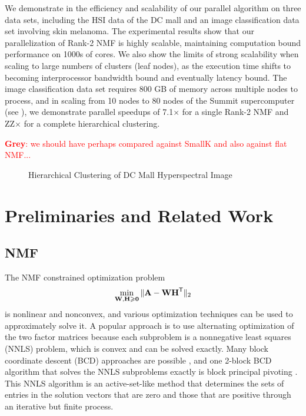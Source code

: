 \documentclass[conference,compsoc]{IEEEtran}
\newcommand{\GB}[1]{\textcolor{red}{\textbf{Grey}: #1}}
\begin{document}
We demonstrate in  the efficiency and scalability of our parallel algorithm on three data sets, including the HSI data of the DC mall and an image classification data set involving skin melanoma.
The experimental results show that our parallelization of Rank-2 NMF is highly scalable, maintaining computation bound performance on 1000s of cores.
We also show the limits of strong scalability when scaling to large numbers of clusters (leaf nodes), as the execution time shifts to becoming interprocessor bandwidth bound and eventually latency bound.
The image classification data set requires 800 GB of memory across multiple nodes to process, and in scaling from 10 nodes to 80 nodes of the Summit supercomputer (see ), we demonstrate parallel speedups of 7.1$\times$ for a single Rank-2 NMF and ZZ$\times$ for a complete hierarchical clustering.

\GB{we should have perhaps compared against SmallK and also against flat NMF...}

\begin{figure}

\caption{Hierarchical Clustering of DC Mall Hyperspectral Image}
\label{fig:dc}
\end{figure}


\section{Preliminaries and Related Work}
\label{sec:prelim}

\subsection{NMF}

The NMF constrained optimization problem
$$\min_{\M{W},\M{H}\geq \M{0}} \|\M{A} - \M{W}\M{H}^\Tra\|_2$$
is nonlinear and nonconvex, and various optimization techniques can be used to approximately solve it.
A popular approach is to use alternating optimization of the two factor matrices because each subproblem is a nonnegative least squares (NNLS) problem, which is convex and can be solved exactly.
Many block coordinate descent (BCD) approaches are possible \cite{KHP14}, and one 2-block BCD algorithm that solves the NNLS subproblems exactly is block principal pivoting \cite{KP11}.
This NNLS algorithm is an active-set-like method that determines the sets of entries in the solution vectors that are zero and those that are positive through an iterative but finite process.
\end{document}
